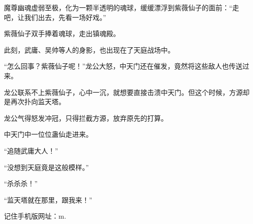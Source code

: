 \begin{this_body}
魔尊幽魂虚弱至极，化为一颗半透明的魂球，缓缓漂浮到紫薇仙子的面前：“走吧，让我们出去，先看一场好戏。”

紫薇仙子双手捧着魂球，走出镇魂殿。

此刻，武庸、吴帅等人的身影，也出现在了天庭战场中。

“怎么回事？紫薇仙子呢！”龙公大怒，中天门还在催发，竟然将这些敌人也传送过来。

龙公联系不上紫薇仙子，心中一沉，就想要直接击溃中天门。但这个时候，方源却是再次扑向监天塔。

龙公气得怒发冲冠，只得拦截方源，放弃原先的打算。

中天门中一位位蛊仙走进来。

“追随武庸大人！”

“没想到天庭竟是这般模样。”

“杀杀杀！”

“监天塔就在那里，跟我来！”

记住手机版网址：m.

\end{this_body}

